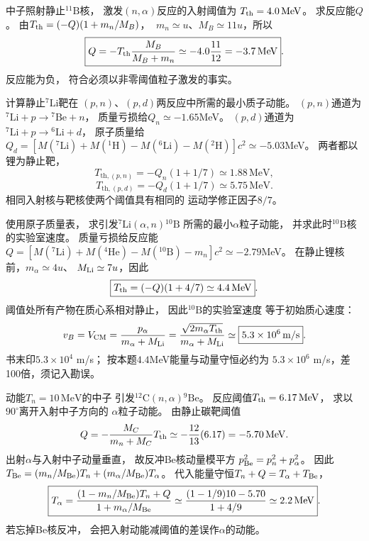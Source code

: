 中子照射静止$^{11}\mathrm B$核，
激发$(n,\alpha)$反应的入射阈值为
$T_{\rm th}=4.0\,\mathrm{MeV}$。
求反应能$Q$。
\exsolution
由$T_{\rm th}=(-Q)(1+m_n/M_B)$，
$\;m_n\simeq u$、$M_B\simeq11u$，所以
\[
 \boxed{Q=-T_{\rm th}\frac{M_B}{M_B+m_n}
 \simeq-4.0\frac{11}{12}
 =-3.7\,\mathrm{MeV}}.
\]
\excheck 反应能为负，
符合必须以非零阈值粒子激发的事实。

计算静止$^{7}\mathrm{Li}$靶在
$(p,n)$、$(p,d)$两反应中所需的最小质子动能。
\exsolution
$(p,n)$通道为
$^{7}\mathrm{Li}+p\to{}^{7}\mathrm{Be}+n$，
质量亏损给$Q_n\simeq-1.65$MeV。
$(p,d)$通道为
$^{7}\mathrm{Li}+p\to{}^{6}\mathrm{Li}+d$，
原子质量给
$Q_d=[M(^{7}\mathrm{Li})+M(^1\mathrm H)
 -M(^{6}\mathrm{Li})-M(^2\mathrm H)]c^2
 \simeq-5.03$MeV。
两者都以锂为静止靶，
\[
 \boxed{T_{\mathrm{th},(p,n)}
 =-Q_n(1+1/7)\simeq1.88\,\mathrm{MeV}},
\]
\[
 \boxed{T_{\mathrm{th},(p,d)}
 =-Q_d(1+1/7)\simeq5.75\,\mathrm{MeV}}.
\]
\excheck 相同入射核与靶核使两个阈值具有相同的
运动学修正因子$8/7$。

使用原子质量表，
求引发$^{7}\mathrm{Li}(\alpha,n){}^{10}\mathrm B$
所需的最小$\alpha$粒子动能，
并求此时$^{10}\mathrm B$核的实验室速度。
\exsolution
质量亏损给反应能
$Q=[M(^{7}\mathrm{Li})+M(^{4}\mathrm{He})
-M(^{10}\mathrm B)-m_n]c^2\simeq-2.79$MeV。
在静止锂核前，$m_\alpha\simeq4u$、
$M_{\rm Li}\simeq7u$，因此
\[
 \boxed{T_{\rm th}=(-Q)(1+4/7)
 \simeq4.4\,\mathrm{MeV}}.
\]
阈值处所有产物在质心系相对静止，
因此$^{10}\mathrm B$的实验室速度
等于初始质心速度：
\[
 v_B=V_{\rm CM}
 =\frac{p_\alpha}{m_\alpha+M_{\rm Li}}
 =\frac{\sqrt{2m_\alpha T_{\rm th}}}{m_\alpha+M_{\rm Li}}
 \simeq\boxed{5.3\times10^6\,\mathrm{m/s}}.
\]
\excheck 书末印$5.3\times10^4$ m/s；
按本题$4.4$MeV能量与动量守恒必约为
$5.3\times10^6$ m/s，差100倍，须记入勘误。

动能$T_n=10\,\mathrm{MeV}$的中子
引发$^{12}\mathrm C(n,\alpha){}^{9}\mathrm{Be}$。
反应阈值$T_{\rm th}=6.17\,\mathrm{MeV}$，
求以$90^\circ$离开入射中子方向的
$\alpha$粒子动能。
\exsolution
由静止碳靶阈值
\[
 Q=-\frac{M_C}{m_n+M_C}T_{\rm th}
 \simeq-\frac{12}{13}(6.17)
 =-5.70\,\mathrm{MeV}.
\]
出射$\alpha$与入射中子动量垂直，
故反冲Be核动量模平方
$p_{\rm Be}^2=p_n^2+p_\alpha^2$。
因此
$T_{\rm Be}=(m_n/M_{\rm Be})T_n+
(m_\alpha/M_{\rm Be})T_\alpha$。
代入能量守恒$T_n+Q=T_\alpha+T_{\rm Be}$，
\[
 \boxed{T_\alpha=
 \frac{(1-m_n/M_{\rm Be})T_n+Q}
 {1+m_\alpha/M_{\rm Be}}
 \simeq\frac{(1-1/9)10-5.70}{1+4/9}
 \simeq2.2\,\mathrm{MeV}}.
\]
\excheck 若忘掉Be核反冲，
会把入射动能减阈值的差误作$\alpha$的动能。

